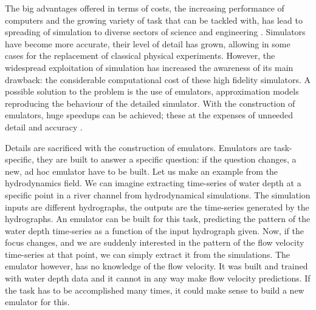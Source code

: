 






The big advantages offered in terms of costs, the increasing performance of computers and the growing variety of task that can be tackled with, has lead to spreading of simulation to diverse sectors of science and engineering \autocite{gorissen_surrogate_2010}.
Simulators have become more accurate, their level of detail has grown, allowing in some cases for the replacement of classical physical experiments.
However, the widespread exploitation of simulation has increased the awareness of its main drawback: the considerable computational cost of these high fidelity simulators.
A possible solution to the problem is the use of emulators, approximation models reproducing the behaviour of the detailed simulator.
With the construction of emulators, huge speedups can be achieved; these at the expenses of unneeded detail and accuracy \autocite{carbajal_appraisal_2016}.

Details are sacrificed with the construction of emulators. Emulators are task-specific, they are built to answer a specific question: if the question changes, a new, ad hoc emulator have to be built.
Let us make an example from the hydrodynamics field.
We can imagine extracting time-series of water depth at a specific point in a river channel from hydrodynamical simulations.
The simulation inputs are different hydrographs, the outputs are the time-series generated by the hydrographs.
An emulator can be built for this task, predicting the pattern of the water depth time-series as a function of the input hydrograph given.
Now, if the focus changes, and we are suddenly interested in the pattern of the flow velocity time-series at that point, we can simply extract it from the simulations.
The emulator however, has no knowledge of the flow velocity.
It was built and trained with water depth data and it cannot in any way make flow velocity predictions.
If the task has to be accomplished many times, it could make sense to build a new emulator for this.

